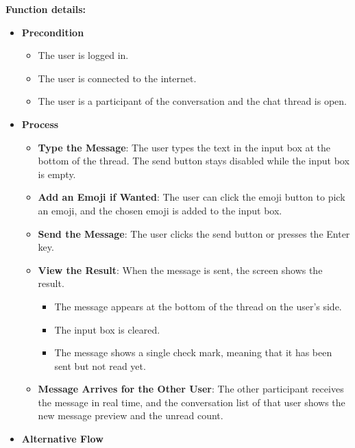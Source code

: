 \textbf{Function details:}

\begin{itemize}[leftmargin=1.6em,topsep=4pt,itemsep=3pt,parsep=0pt,label=$\bullet$]
    \item \textbf{Precondition}

        \begin{itemize}[leftmargin=2.2em,topsep=2pt,itemsep=3pt,parsep=0pt,label=$\circ$]
            \item The user is logged in.
            \item The user is connected to the internet.
            \item The user is a participant of the conversation and the chat thread is open.
        \end{itemize}
    \item \textbf{Process}

        \begin{itemize}[leftmargin=2.2em,topsep=2pt,itemsep=3pt,parsep=0pt,label=$\circ$]
            \item \textbf{Type the Message}: The user types the text in the input box at the bottom of the thread. The send button stays disabled while the input box is empty.
            \item \textbf{Add an Emoji if Wanted}: The user can click the emoji button to pick an emoji, and the chosen emoji is added to the input box.
            \item \textbf{Send the Message}: The user clicks the send button or presses the Enter key.
            \item \textbf{View the Result}: When the message is sent, the screen shows the result.
                \begin{itemize}[leftmargin=2.2em,topsep=2pt,itemsep=3pt,parsep=0pt,label=$\blacksquare$]
                    \item The message appears at the bottom of the thread on the user's side.
                    \item The input box is cleared.
                    \item The message shows a single check mark, meaning that it has been sent but not read yet.
                \end{itemize}
            \item \textbf{Message Arrives for the Other User}: The other participant receives the message in real time, and the conversation list of that user shows the new message preview and the unread count.
        \end{itemize}
    \item \textbf{Alternative Flow}


\end{itemize}
